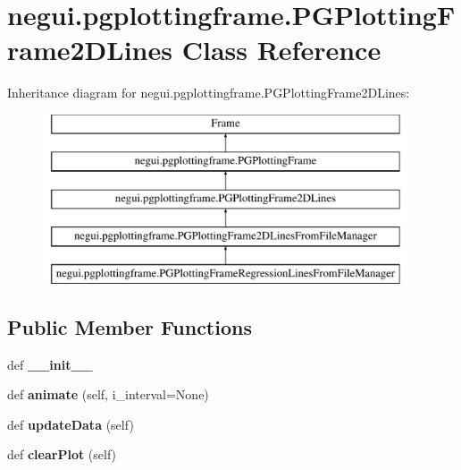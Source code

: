 \hypertarget{classnegui_1_1pgplottingframe_1_1PGPlottingFrame2DLines}{}\section{negui.\+pgplottingframe.\+P\+G\+Plotting\+Frame2\+D\+Lines Class Reference}
\label{classnegui_1_1pgplottingframe_1_1PGPlottingFrame2DLines}
Inheritance diagram for negui.\+pgplottingframe.\+P\+G\+Plotting\+Frame2\+D\+Lines\+:\begin{figure}[H]
\begin{center}
\leavevmode
\includegraphics[height=5.000000cm]{classnegui_1_1pgplottingframe_1_1PGPlottingFrame2DLines}
\end{center}
\end{figure}
\subsection*{Public Member Functions}
\begin{DoxyCompactItemize}
\item 
def {\bfseries \+\_\+\+\_\+init\+\_\+\+\_\+}\hypertarget{classnegui_1_1pgplottingframe_1_1PGPlottingFrame2DLines_ab99a73b954dae4734bb522ac88df7e65}{}\label{classnegui_1_1pgplottingframe_1_1PGPlottingFrame2DLines_ab99a73b954dae4734bb522ac88df7e65}

\item 
def {\bfseries animate} (self, i\+\_\+interval=None)\hypertarget{classnegui_1_1pgplottingframe_1_1PGPlottingFrame2DLines_a65b8203bd313182530c759e3d69566fd}{}\label{classnegui_1_1pgplottingframe_1_1PGPlottingFrame2DLines_a65b8203bd313182530c759e3d69566fd}

\item 
def {\bfseries update\+Data} (self)\hypertarget{classnegui_1_1pgplottingframe_1_1PGPlottingFrame2DLines_afe5e923eb181ba12a5e48c11a2f43123}{}\label{classnegui_1_1pgplottingframe_1_1PGPlottingFrame2DLines_afe5e923eb181ba12a5e48c11a2f43123}

\item 
def {\bfseries clear\+Plot} (self)\hypertarget{classnegui_1_1pgplottingframe_1_1PGPlottingFrame2DLines_aeee574069a0555b8293c30dfec3109bb}{}\label{classnegui_1_1pgplottingframe_1_1PGPlottingFrame2DLines_aeee574069a0555b8293c30dfec3109bb}

\end{DoxyCompactItemize}
